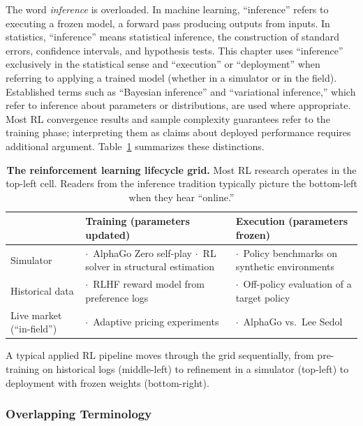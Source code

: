 The word \textit{inference} is overloaded. In machine learning, ``inference'' refers to executing a frozen model, a forward pass producing outputs from inputs. In statistics, ``inference'' means statistical inference, the construction of standard errors, confidence intervals, and hypothesis tests. This chapter uses ``inference'' exclusively in the statistical sense and ``execution'' or ``deployment'' when referring to applying a trained model (whether in a simulator or in the field). Established terms such as ``Bayesian inference'' and ``variational inference,'' which refer to inference about parameters or distributions, are used where appropriate. Most RL convergence results and sample complexity guarantees refer to the training phase; interpreting them as claims about deployed performance requires additional argument. Table~\ref{tab:lifecycle_grid} summarizes these distinctions.

\newcommand{\tabitem}{{\small$\cdot$}~}
\begin{table}[h]
\centering
\caption[The reinforcement learning lifecycle grid]{\textbf{The reinforcement learning lifecycle grid.} Most RL research operates in the top-left cell. Readers from the inference tradition typically picture the bottom-left when they hear ``online.''}
\label{tab:lifecycle_grid}
\begin{tabular}{|p{2.8cm}|p{5.5cm}|p{5.5cm}|}
\hline
 & Training (parameters updated) & Execution (parameters frozen) \\
\hline
Simulator &
  \tabitem AlphaGo Zero self-play \newline
  \tabitem RL solver in structural estimation &
  \tabitem Policy benchmarks on synthetic environments \\
\hline
Historical data &
  \tabitem RLHF reward model from preference logs &
  \tabitem Off-policy evaluation of a target policy \\
\hline
Live market (``in-field'') &
  \tabitem Adaptive pricing experiments &
  \tabitem AlphaGo vs.\ Lee Sedol \\
\hline
\end{tabular}
\end{table}

A typical applied RL pipeline moves through the grid sequentially, from pre-training on historical logs (middle-left) to refinement in a simulator (top-left) to deployment with frozen weights (bottom-right).

\subsubsection{Overlapping Terminology}
\label{subsec:overlapping_terminology}

